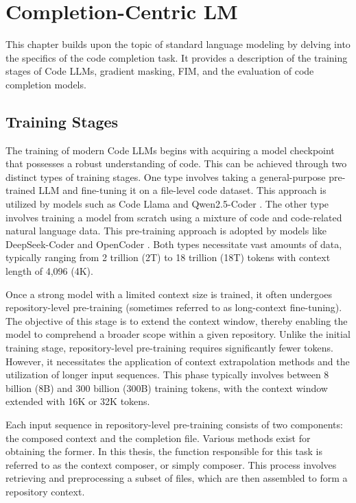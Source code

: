 \chapter{Completion-Centric LM}\label{chap:completion-centric-lm}

This chapter builds upon the topic of standard language modeling by delving into the specifics of the code completion task. It provides a description of the training stages of Code LLMs, gradient masking, FIM, and the evaluation of code completion models.  

\section{Training Stages}\label{sec:training-stages}

The training of modern Code LLMs begins with acquiring a model checkpoint that possesses a robust understanding of code. This can be achieved through two distinct types of training stages. One type involves taking a general-purpose pre-trained LLM and fine-tuning it on a file-level code dataset. This approach is utilized by models such as Code Llama \parencite{rozière2023} and Qwen2.5-Coder \parencite{hui2024}. The other type involves training a model from scratch using a mixture of code and code-related natural language data. This pre-training approach is adopted by models like DeepSeek-Coder \parencite{guo2024} and OpenCoder \parencite{huang2024}. Both types necessitate vast amounts of data, typically ranging from 2 trillion (2T) to 18 trillion (18T) tokens with context length of 4,096 (4K). 

Once a strong model with a limited context size is trained, it often undergoes repository-level pre-training (sometimes referred to as long-context fine-tuning). The objective of this stage is to extend the context window, thereby enabling the model to comprehend a broader scope within a given repository. Unlike the initial training stage, repository-level pre-training requires significantly fewer tokens. However, it necessitates the application of context extrapolation methods and the utilization of longer input sequences. This phase typically involves between 8 billion (8B) and 300 billion (300B) training tokens, with the context window extended with 16K or 32K tokens.

Each input sequence in repository-level pre-training consists of two components: the composed context and the completion file. Various methods exist for obtaining the former. In this thesis, the function responsible for this task is referred to as the context composer, or simply composer. This process involves retrieving and preprocessing a subset of files, which are then assembled to form a repository context.

